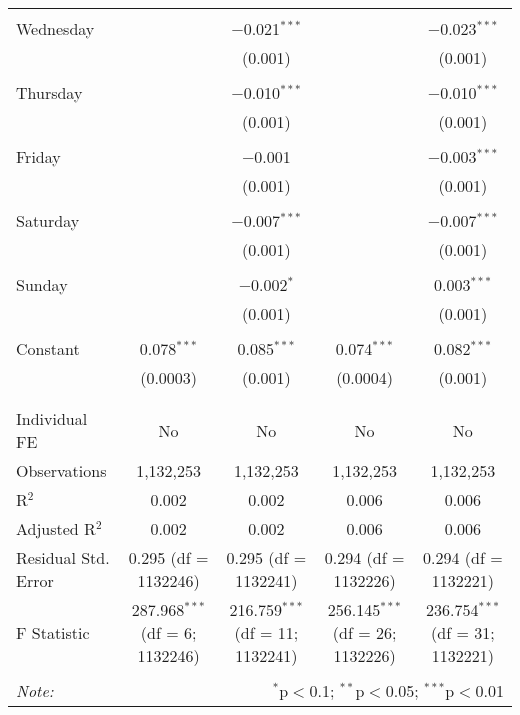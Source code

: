 \documentclass[
]{article}
\begin{document}
\begin{table}[!htbp]
{\begin{tabular}{@{\extracolsep{5pt}}lcccc}
  & & & & \\ 
 Wednesday &  & $-$0.021$^{***}$ &  & $-$0.023$^{***}$ \\ 
  &  & (0.001) &  & (0.001) \\ 
  & & & & \\ 
 Thursday &  & $-$0.010$^{***}$ &  & $-$0.010$^{***}$ \\ 
  &  & (0.001) &  & (0.001) \\ 
  & & & & \\ 
 Friday &  & $-$0.001 &  & $-$0.003$^{***}$ \\ 
  &  & (0.001) &  & (0.001) \\ 
  & & & & \\ 
 Saturday &  & $-$0.007$^{***}$ &  & $-$0.007$^{***}$ \\ 
  &  & (0.001) &  & (0.001) \\ 
  & & & & \\ 
 Sunday &  & $-$0.002$^{*}$ &  & 0.003$^{***}$ \\ 
  &  & (0.001) &  & (0.001) \\ 
  & & & & \\ 
 Constant & 0.078$^{***}$ & 0.085$^{***}$ & 0.074$^{***}$ & 0.082$^{***}$ \\ 
  & (0.0003) & (0.001) & (0.0004) & (0.001) \\ 
  & & & & \\ 
\hline \\[-1.8ex] 
Individual FE & No & No & No & No \\ 
Observations & 1,132,253 & 1,132,253 & 1,132,253 & 1,132,253 \\ 
R$^{2}$ & 0.002 & 0.002 & 0.006 & 0.006 \\ 
Adjusted R$^{2}$ & 0.002 & 0.002 & 0.006 & 0.006 \\ 
Residual Std. Error & 0.295 (df = 1132246) & 0.295 (df = 1132241) & 0.294 (df = 1132226) & 0.294 (df = 1132221) \\ 
F Statistic & 287.968$^{***}$ (df = 6; 1132246) & 216.759$^{***}$ (df = 11; 1132241) & 256.145$^{***}$ (df = 26; 1132226) & 236.754$^{***}$ (df = 31; 1132221) \\ 
\hline 
\hline \\[-1.8ex] 
\textit{Note:}  & \multicolumn{4}{r}{$^{*}$p$<$0.1; $^{**}$p$<$0.05; $^{***}$p$<$0.01} \\ 
\end{tabular}
} 
\end{table} 
\newpage
\end{document}
